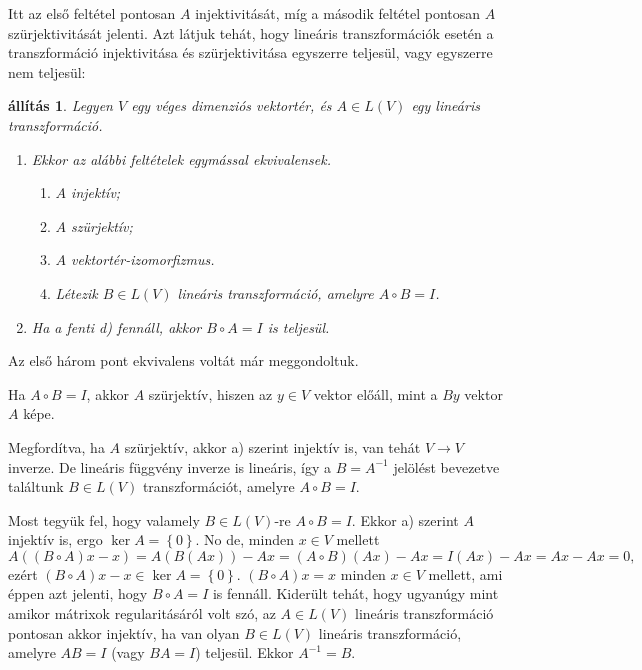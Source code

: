 \documentclass[9pt, a4paper, showtrims]{memoir}
\makeatletter
\renewenvironment{proof}[1][\proofname]
    {\par\pushQED{\qed}%
    \normalfont \topsep6\p@\@plus6\p@\relax
    \trivlist
    \item[\hskip\labelsep
        \itshape
    #1\@addpunct{:}]\ignorespaces}
    {\popQED\endtrivlist\@endpefalse}
\theoremstyle{plain}
\newtheorem{proposition}{állítás}[chapter]
\theoremstyle{remark}
\theoremstyle{definition}
\makeatother
\begin{document}
Itt az első feltétel pontosan $A$ injektivitását,
míg a második feltétel pontosan $A$ szürjektivitását jelenti.
Azt látjuk tehát,
hogy lineáris transzformációk esetén a transzformáció injektivitása és szürjektivitása egyszerre teljesül,
vagy egyszerre nem teljesül:
\begin{proposition}
	Legyen $V$ egy véges dimenziós vektortér, és $A\in L\left( V \right)$ egy lineáris transzformáció.
	\begin{enumerate}
		\item
		      Ekkor az alábbi feltételek egymással ekvivalensek.
		      \begin{enumerate}
			      \item $A$ injektív;
			      \item $A$ szürjektív;
			      \item $A$ vektortér-izomorfizmus.
			      \item Létezik $B\in L\left( V \right)$ lineáris transzformáció, amelyre $A\circ B=I$.
		      \end{enumerate}
		\item
		      Ha a fenti d) fennáll, akkor $B\circ A=I$ is teljesül.\qedhere
	\end{enumerate}
\end{proposition}
\begin{proof}
	Az első három pont ekvivalens voltát már meggondoltuk.

	Ha $A\circ B=I$, akkor $A$ szürjektív, hiszen az $y\in V$ vektor előáll,
	mint a $By$ vektor $A$ képe.

	Megfordítva, ha $A$ szürjektív, akkor a) szerint injektív is, van tehát $V\to V$ inverze.
	De lineáris függvény inverze is lineáris,
	így a $B=A^{-1}$ jelölést bevezetve találtunk $B\in L\left( V \right)$
	transzformációt, amelyre $A\circ B=I$.

	Most tegyük fel, hogy valamely $B\in L\left( V \right)$-re $A\circ B=I$.
	Ekkor a) szerint $A$ injektív is, ergo $\ker A=\left\{ 0 \right\}$.
	No de, minden $x\in V$ mellett
	\[
		A\left( (B\circ A)x-x \right)
		=
		A\left( B\left( Ax \right) \right)-Ax
		=
		\left( A\circ B \right)\left( Ax \right)-Ax
		=
		I\left( Ax \right)-Ax
		=
		Ax-Ax=0,
	\]
	ezért $(B\circ A)x-x\in\ker A=\left\{ 0 \right\}$.
	$(B\circ A)x=x$ minden $x\in V$ mellett, ami éppen azt jelenti, hogy $B\circ A=I$ is fennáll.
\end{proof}
Kiderült tehát, hogy ugyanúgy mint amikor mátrixok regularitásáról volt szó,
az $A\in L\left( V \right)$ lineáris transzformáció pontosan akkor injektív,
ha van olyan $B\in L\left( V \right)$ lineáris transzformáció,
amelyre $AB=I$ (vagy $BA=I$) teljesül.
Ekkor $A^{-1}=B$.
\end{document}
